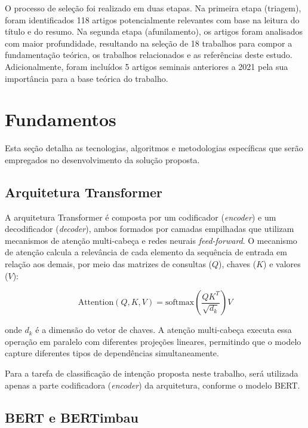 \documentclass[
    12pt,                %
    openright,           %
    oneside,             %
    a4paper,             %
    english,             %
    brazil               %
]{abntex2}
\begin{document}
O processo de seleção foi realizado em duas etapas. Na primeira etapa (triagem), foram identificados 118 artigos potencialmente relevantes com base na leitura do título e do resumo. Na segunda etapa (afunilamento), os artigos foram analisados com maior profundidade, resultando na seleção de 18 trabalhos para compor a fundamentação teórica, os trabalhos relacionados e as referências deste estudo. Adicionalmente, foram incluídos 5 artigos seminais anteriores a 2021 pela sua importância para a base teórica do trabalho.

\section{Fundamentos}
\label{sec:fundamentos}

Esta seção detalha as tecnologias, algoritmos e metodologias específicas que serão empregados no desenvolvimento da solução proposta.

\subsection{Arquitetura Transformer}

A arquitetura Transformer \cite{Vaswani2017} é composta por um codificador (\textit{encoder}) e um decodificador (\textit{decoder}), ambos formados por camadas empilhadas que utilizam mecanismos de atenção multi-cabeça e redes neurais \textit{feed-forward}. O mecanismo de atenção calcula a relevância de cada elemento da sequência de entrada em relação aos demais, por meio das matrizes de consultas ($Q$), chaves ($K$) e valores ($V$):

\begin{equation}
\text{Attention}(Q, K, V) = \text{softmax}\left(\frac{QK^T}{\sqrt{d_k}}\right)V
\label{eq:attention}
\end{equation}

\noindent onde $d_k$ é a dimensão do vetor de chaves. A atenção multi-cabeça executa essa operação em paralelo com diferentes projeções lineares, permitindo que o modelo capture diferentes tipos de dependências simultaneamente.

Para a tarefa de classificação de intenção proposta neste trabalho, será utilizada apenas a parte codificadora (\textit{encoder}) da arquitetura, conforme o modelo BERT.

\subsection{BERT e BERTimbau}
\end{document}
